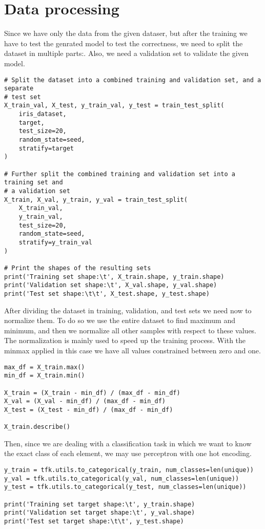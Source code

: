 \section{Data processing}

Since we have only the data from the given dataser, but after the training we have to test the genrated model to test the correctness, we need to split the dataset in multiple parts:. 
Also, we need a validation set to validate the given model. 
\begin{lstlisting}[style=Python]
# Split the dataset into a combined training and validation set, and a separate 
# test set
X_train_val, X_test, y_train_val, y_test = train_test_split(
    iris_dataset,
    target,
    test_size=20,
    random_state=seed,
    stratify=target
)

# Further split the combined training and validation set into a training set and 
# a validation set
X_train, X_val, y_train, y_val = train_test_split(
    X_train_val,
    y_train_val,
    test_size=20,
    random_state=seed,
    stratify=y_train_val
)

# Print the shapes of the resulting sets
print('Training set shape:\t', X_train.shape, y_train.shape)
print('Validation set shape:\t', X_val.shape, y_val.shape)
print('Test set shape:\t\t', X_test.shape, y_test.shape)
\end{lstlisting}
After dividing the dataset in training, validation, and test sets we need now to normalize them.
To do so we use the entire dataset to find maximum and minimum, and then we normalize all other samples with respect to these values. 
The normalization is mainly used to speed up the training process. 
With the minmax applied in this case we have all values constrained between zero and one. 
\begin{lstlisting}[style=Python]
max_df = X_train.max()
min_df = X_train.min()

X_train = (X_train - min_df) / (max_df - min_df)
X_val = (X_val - min_df) / (max_df - min_df)
X_test = (X_test - min_df) / (max_df - min_df)

X_train.describe()
\end{lstlisting}
Then, since we are dealing with a classification task in which we want to know the exact class of each element, we may use perceptron with one hot encoding.
\begin{lstlisting}[style=Python]
y_train = tfk.utils.to_categorical(y_train, num_classes=len(unique))
y_val = tfk.utils.to_categorical(y_val, num_classes=len(unique))
y_test = tfk.utils.to_categorical(y_test, num_classes=len(unique))

print('Training set target shape:\t', y_train.shape)
print('Validation set target shape:\t', y_val.shape)
print('Test set target shape:\t\t', y_test.shape)
\end{lstlisting}